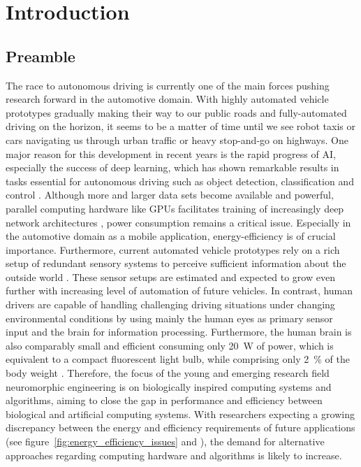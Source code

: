 \chapter{Introduction}%
\label{chap:introduction}

\section{Preamble}%
\label{sec:preamble}

The race to autonomous driving is currently one of the main forces pushing research forward in the automotive domain.
With highly automated vehicle prototypes gradually making their way to our public roads and fully-automated driving on the horizon, it seems to be a matter of time until we see robot taxis or cars navigating us through urban traffic or heavy stop-and-go on highways.
One major reason for this development in recent years is the rapid progress of \ac{AI}, especially the success of deep learning, which has shown remarkable results in tasks essential for autonomous driving such as object detection, classification \cite{Ciresan2012} and control \cite{Bojarski2016}.
Although more and larger data sets \cite{Geiger2013a, Cordts2016} become available and powerful, parallel computing hardware like \acp{GPU} facilitates training of increasingly deep network architectures \cite{Simonyan2014}, power consumption remains a critical issue.
Especially in the automotive domain as a mobile application, energy-efficiency is of crucial importance.
Furthermore, current automated vehicle prototypes rely on a rich setup of redundant sensory systems to perceive sufficient information about the outside world \cite{Aeberhard2015}.
These sensor setups are estimated and expected to grow even further with increasing level of automation of future vehicles.
In contrast, human drivers are capable of handling challenging driving situations under changing environmental conditions by using mainly the human eyes as primary sensor input and the brain for information processing.
Furthermore, the human brain is also comparably small and efficient consuming only \SI{20}{\watt} of power, which is equivalent to a compact fluorescent light bulb, while comprising only \SI{2}{\percent} of the body weight \cite[Chap. 2.1]{Eliasmith2013}.
Therefore, the focus of the young and emerging research field neuromorphic engineering is on biologically inspired computing systems and algorithms, aiming to close the gap in performance and efficiency between biological and artificial computing systems.
With researchers expecting a growing discrepancy between the energy and efficiency requirements of future applications (see figure~\ref{fig:energy_efficiency_issues} and \cite{Marr2013, Farahini2016, Akopyan2015}), the demand for alternative approaches regarding computing hardware and algorithms is likely to increase.
